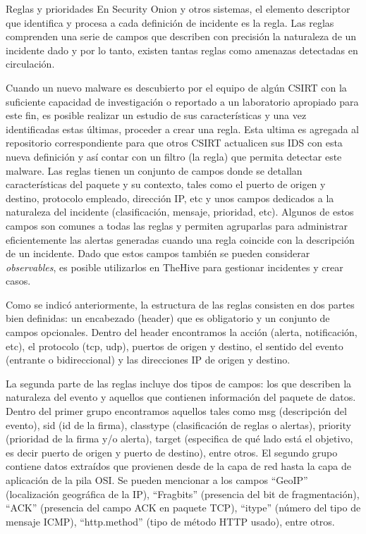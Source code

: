     \begin{section}{Reglas y prioridades}
    En Security Onion y otros sistemas, el elemento descriptor que identifica y procesa a cada definición de incidente es la regla. Las reglas comprenden una serie de campos que describen con precisión la naturaleza de un incidente dado y por lo tanto, existen tantas reglas como amenazas detectadas en circulación. \par
    Cuando un nuevo malware es descubierto por el equipo de algún CSIRT con la suficiente capacidad de investigación o reportado a un laboratorio apropiado para este fin, es posible realizar un estudio de sus características y una vez identificadas estas últimas, proceder a crear una regla. Esta ultima es agregada al repositorio correspondiente para que otros CSIRT actualicen sus IDS con esta nueva definición y así contar con un filtro (la regla) que permita detectar este malware. Las reglas tienen un conjunto de campos donde se detallan características del paquete y su contexto, tales como el puerto de origen y destino, protocolo empleado, dirección IP, etc y unos campos dedicados a la naturaleza del incidente (clasificación, mensaje, prioridad, etc). Algunos de estos campos son comunes a todas las reglas y permiten agruparlas para administrar eficientemente las alertas generadas cuando una regla coincide con la descripción de un incidente. Dado que estos campos también se pueden considerar \textit{observables}, es posible utilizarlos en TheHive para gestionar incidentes y crear casos. \par
    Como se indicó anteriormente, la estructura de las reglas consisten en dos partes bien definidas: un encabezado (header) que es obligatorio  y un conjunto de campos opcionales. Dentro del header encontramos la acción (alerta, notificación, etc), el protocolo (tcp, udp), puertos de origen y destino, el sentido del evento (entrante o bidireccional) y las direcciones IP de origen y destino. \par
    La segunda parte de las reglas incluye dos tipos de campos: los que describen la naturaleza del evento y aquellos que contienen información del paquete de datos. Dentro del primer grupo encontramos aquellos tales como msg (descripción del evento), sid (id de la firma), classtype (clasificación de reglas o alertas), priority (prioridad de la firma y/o alerta), target (especifica de qué lado está el objetivo, es decir puerto de origen y puerto de destino), entre otros. El segundo grupo contiene datos extraídos que provienen desde de la capa de red hasta la capa de aplicación de la pila OSI. Se pueden mencionar a los campos “GeoIP” (localización geográfica de la IP), “Fragbits” (presencia del bit de fragmentación), “ACK” (presencia del campo ACK en paquete TCP), “itype” (número del tipo de mensaje ICMP), “http.method” (tipo de método HTTP usado), entre otros.

\end{section}
